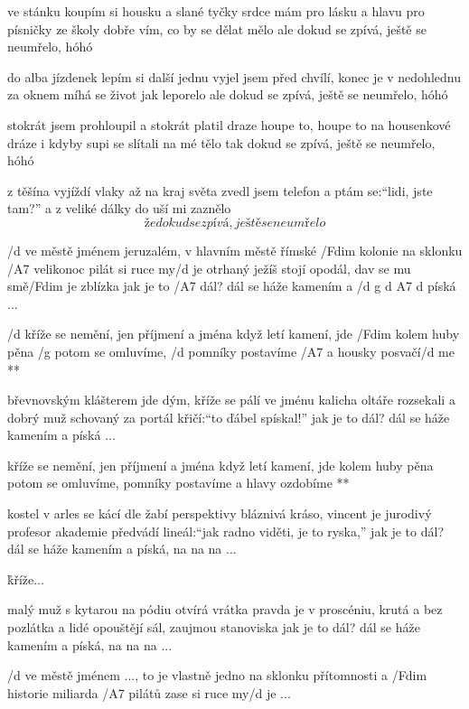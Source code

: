 ve stánku koupím si housku a slané tyčky
srdce mám pro lásku a hlavu pro písničky
ze školy dobře vím, co by se dělat mělo
ale dokud se zpívá, ještě se neumřelo, hóhó \s

do alba jízdenek lepím si další jednu
vyjel jsem před chvílí, konec je v nedohlednu
za oknem míhá se život jak leporelo
ale dokud se zpívá, ještě se neumřelo, hóhó \s

stokrát jsem prohloupil a stokrát platil draze
houpe to, houpe to na housenkové dráze
i kdyby supi se slítali na mé tělo
tak dokud se zpívá, ještě se neumřelo, hóhó \s

z těšína vyjíždí vlaky až na kraj světa
zvedl jsem telefon a ptám se:``lidi, jste tam?''
a z veliké dálky do uší mi zaznělo
\[ že dokud se zpívá, ještě se neumřelo \]




/d ve městě jménem jeruzalém, v hlavním městě římské /Fdim kolonie
na sklonku /A7 velikonoc pilát si ruce my/d je
otrhaný ježíš stojí opodál, dav se mu smě/Fdim je zblízka
jak je to /A7 dál? dál se háže kamením a /{d g d A7 d} píská ...

\R  /d kříže se nemění, jen příjmení a jména
    když letí kamení, jde /Fdim kolem huby pěna
    /g potom se omluvíme, /d pomníky postavíme
    /A7 a housky posvačí/d me **

břevnovským klášterem jde dým, kříže se pálí
ve jménu kalicha oltáře rozsekali
a dobrý muž schovaný za portál křičí:``to ďábel spískal!''
jak je to dál? dál se háže kamením a píská ...

\R  kříže se nemění, jen příjmení a jména
    když letí kamení, jde kolem huby pěna
    potom se omluvíme, pomníky postavíme
    a hlavy ozdobíme **

kostel v arles se kácí dle žabí perspektivy
bláznivá kráso, vincent je jurodivý
profesor akademie předvádí lineál:``jak radno viděti, je to ryska,''
jak je to dál? dál se háže kamením a píská, na na na ...

\r  kříže...

malý muž s kytarou na pódiu otvírá vrátka
pravda je v proscéniu, krutá a bez pozlátka
a lidé opouštějí sál, zaujmou stanoviska
jak je to dál? dál se háže kamením a píská, na na na ...

\rr

/d ve městě jménem ..., to je vlastně jedno
na sklonku přítomnosti a /Fdim historie
miliarda /A7 pilátů zase si ruce my/d je ...



